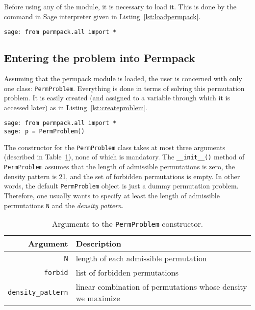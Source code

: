Before using any of the module, it is necessary to load it. This is done by the command in Sage interpreter given in Listing~\ref{lst:loadpermpack}.
 {}
\begin{lstlisting}
sage: from permpack.all import *
\end{lstlisting}

\subsection{Entering the problem into Permpack}

Assuming that the permpack module is loaded, the user is concerned with only one class: \texttt{PermProblem}. Everything is done in terms of solving this permutation problem. It is easily created (and assigned to a variable through which it is accessed later) as in Listing~\ref{lst:createproblem}. 
 {}
\begin{lstlisting}
sage: from permpack.all import *
sage: p = PermProblem()
\end{lstlisting}

The constructor for the \texttt{PermProblem} class takes at most three arguments (described in Table~\ref{tab:argspermproblem}), none of which is mandatory. The \texttt{\_\_init\_\_()} method of \texttt{PermProblem} assumes that the length of admissible permutations is zero, the density pattern is 21, and the set of forbidden permutations is empty. In other words, the default \texttt{PermProblem} object is just a dummy permutation problem. Therefore, one usually wants to specify at least the length of admissible permutations \texttt{N} and the \emph{density pattern}.

\begin{table}[ht]
  \centering
    \begin{tabular}{r|l}
      \textbf{Argument} & \textbf{Description}\\
      \hline
      \texttt{N} & length of each admissible permutation\\
      \texttt{forbid} & list of forbidden permutations\\
      \texttt{density\_pattern} & linear combination of permutations whose density we maximize
    \end{tabular}
    \caption{Arguments to the \texttt{PermProblem} constructor.}
    \label{tab:argspermproblem}
\end{table}

